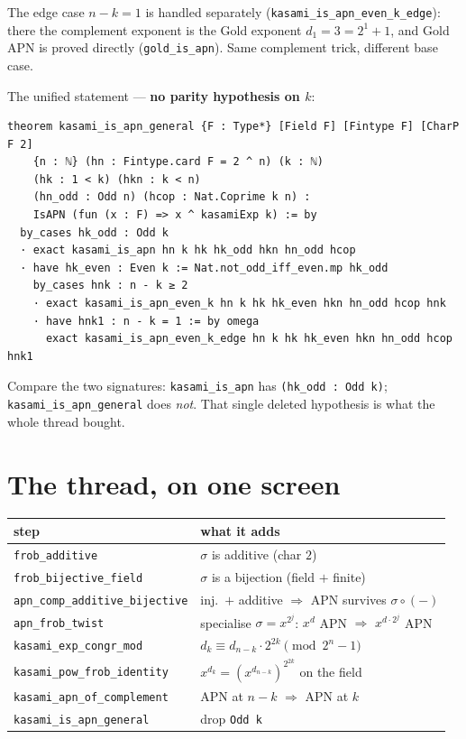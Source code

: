 \documentclass[11pt]{article}
\newcommand{\note}[1]{%
  \par\smallskip
  \noindent\colorbox{leanbg}{\parbox{\dimexpr\linewidth-2\fboxsep}{\small #1}}%
  \par\smallskip}
\begin{document}
\note{The edge case $n-k=1$ is handled separately
(\texttt{kasami\_is\_apn\_even\_k\_edge}): there the complement exponent is the
Gold exponent $d_1 = 3 = 2^1+1$, and Gold APN is proved directly
(\texttt{gold\_is\_apn}). Same complement trick, different base case.}

\bigskip
\noindent
The unified statement --- \textbf{no parity hypothesis on $k$}:

\begin{lstlisting}
theorem kasami_is_apn_general {F : Type*} [Field F] [Fintype F] [CharP F 2]
    {n : ℕ} (hn : Fintype.card F = 2 ^ n) (k : ℕ)
    (hk : 1 < k) (hkn : k < n)
    (hn_odd : Odd n) (hcop : Nat.Coprime k n) :
    IsAPN (fun (x : F) => x ^ kasamiExp k) := by
  by_cases hk_odd : Odd k
  · exact kasami_is_apn hn k hk hk_odd hkn hn_odd hcop
  · have hk_even : Even k := Nat.not_odd_iff_even.mp hk_odd
    by_cases hnk : n - k ≥ 2
    · exact kasami_is_apn_even_k hn k hk hk_even hkn hn_odd hcop hnk
    · have hnk1 : n - k = 1 := by omega
      exact kasami_is_apn_even_k_edge hn k hk hk_even hkn hn_odd hcop hnk1
\end{lstlisting}

\note{Compare the two signatures: \texttt{kasami\_is\_apn} has
\texttt{(hk\_odd : Odd k)}; \texttt{kasami\_is\_apn\_general} does \emph{not}.
That single deleted hypothesis is what the whole thread bought.}

\bigskip

\section*{The thread, on one screen}

\begin{center}
\renewcommand{\arraystretch}{1.55}
\begin{tabular}{l l}
\textbf{step} & \textbf{what it adds} \\
\hline
\texttt{frob\_additive} & $σ$ is additive \;(char $2$) \\
\texttt{frob\_bijective\_field} & $σ$ is a bijection \;(field $+$ finite) \\
\texttt{apn\_comp\_additive\_bijective} & inj.\ $+$ additive $\Rightarrow$ APN survives $σ∘(-)$ \\
\texttt{apn\_frob\_twist} & specialise $σ = x^{2^j}$: $x^{d}$ APN $\Rightarrow$ $x^{d\cdot 2^j}$ APN \\
\texttt{kasami\_exp\_congr\_mod} & $d_k \equiv d_{n-k}\cdot 2^{2k} \pmod{2^n-1}$ \\
\texttt{kasami\_pow\_frob\_identity} & $x^{d_k} = (x^{d_{n-k}})^{2^{2k}}$ on the field \\
\texttt{kasami\_apn\_of\_complement} & APN at $n-k$ $\Rightarrow$ APN at $k$ \\
\texttt{kasami\_is\_apn\_general} & drop \texttt{Odd k} \\
\end{tabular}
\end{center}
\end{document}
